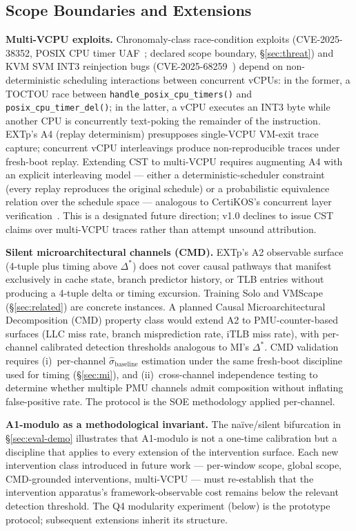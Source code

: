 \documentclass[conference]{IEEEtran}
\newcommand{\sigbase}{\hat{\sigma}_\text{baseline}}
\newcommand{\Dstar}{\Delta^{*}}
\begin{document}
\subsection{Scope Boundaries and Extensions}\label{sec:discussion-scope}

\textbf{Multi-VCPU exploits.} Chronomaly-class race-condition
exploits (CVE-2025-38352, POSIX CPU timer
UAF~\cite{linuxkernel2025chronomaly}; declared scope boundary,
\S\ref{sec:threat}) and KVM SVM INT3 reinjection bugs
(CVE-2025-68259~\cite{linuxkernel2025int3reinject}) depend on
non-deterministic scheduling interactions between concurrent vCPUs:
in the former, a TOCTOU race between
\texttt{handle\_posix\_cpu\_timers()} and
\texttt{posix\_cpu\_timer\_del()}; in the latter, a vCPU executes
an INT3 byte while another CPU is concurrently text-poking the
remainder of the instruction. EXTp's A4 (replay determinism)
presupposes single-VCPU VM-exit trace capture; concurrent vCPU
interleavings produce non-reproducible traces under fresh-boot
replay. Extending CST to multi-VCPU requires augmenting A4 with an
explicit interleaving model --- either a deterministic-scheduler
constraint (every replay reproduces the original schedule) or a
probabilistic equivalence relation over the schedule space ---
analogous to CertiKOS's concurrent layer
verification~\cite{gu2016certikos}. This is a designated future
direction; v1.0 declines to issue CST claims over multi-VCPU
traces rather than attempt unsound attribution.

\textbf{Silent microarchitectural channels (CMD).} EXTp's A2
observable surface (4-tuple plus timing above $\Dstar$) does not
cover causal pathways that manifest exclusively in cache state,
branch predictor history, or TLB entries without producing a
4-tuple delta or timing excursion. Training Solo and VMScape
(\S\ref{sec:related}) are concrete instances. A planned
Causal Microarchitectural Decomposition (CMD) property class
would extend A2 to PMU-counter-based surfaces (LLC miss rate, branch
misprediction rate, iTLB miss rate), with per-channel calibrated
detection thresholds analogous to MI's $\Dstar$. CMD validation
requires (i)~per-channel $\sigbase$ estimation under the same
fresh-boot discipline used for timing (\S\ref{sec:mi}), and
(ii)~cross-channel independence testing to determine whether
multiple PMU channels admit composition without inflating
false-positive rate. The protocol is the SOE methodology applied
per-channel.

\textbf{A1-modulo as a methodological invariant.} The
naïve/silent bifurcation in \S\ref{sec:eval-demo} illustrates that
A1-modulo is not a one-time calibration but a discipline that
applies to every extension of the intervention surface. Each new
intervention class introduced in future work --- per-window scope,
global scope, CMD-grounded interventions, multi-VCPU --- must
re-establish that the intervention apparatus's framework-observable
cost remains below the relevant detection threshold. The Q4
modularity experiment (below) is the prototype protocol; subsequent
extensions inherit its structure.
\end{document}
